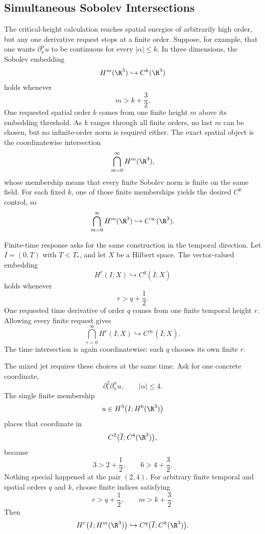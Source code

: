 
\subsection{Simultaneous Sobolev Intersections}\label{sub:SimultaneousSobolevIntersections}

The critical-height calculation reaches spatial energies of arbitrarily high order, but any one derivative request stops at a finite order.
Suppose, for example, that one wants \(\partial_x^\alpha u\) to be continuous for every \(\lvert\alpha\rvert\le k\).
In three dimensions, the Sobolev embedding
\[
  H^m(\R^3)
  \hookrightarrow
  C^k(\R^3)
\]
holds whenever
\[
  m>k+\frac32.
\]
One requested spatial order \(k\) comes from one finite height \(m\) above its embedding threshold.
As \(k\) ranges through all finite orders, no last \(m\) can be chosen, but no infinite-order norm is required either.
The exact spatial object is the coordinatewise intersection
\[
  \bigcap_{m=0}^{\infty}H^m(\R^3),
\]
whose membership means that every finite Sobolev norm is finite on the same field.
For each fixed \(k\), one of those finite memberships yields the desired \(C^k\) control, so
\[
  \bigcap_{m=0}^{\infty}H^m(\R^3)
  \hookrightarrow
  C^\infty(\R^3).
\]

Finite-time response asks for the same construction in the temporal direction.
Let \(I=(0,T)\) with \(T<T_*\), and let \(X\) be a Hilbert space.
The vector-valued embedding
\[
  H^r(I;X)
  \hookrightarrow
  C^q(\overline I;X)
\]
holds whenever
\[
  r>q+\frac12.
\]
One requested time derivative of order \(q\) comes from one finite temporal height \(r\).
Allowing every finite request gives
\[
  \bigcap_{r=0}^{\infty}H^r(I;X)
  \hookrightarrow
  C^\infty(\overline I;X).
\]
The time intersection is again coordinatewise: each \(q\) chooses its own finite \(r\).

The mixed jet requires these choices at the same time.
Ask for one concrete coordinate,
\[
  \partial_t^2\partial_x^\alpha u,
  \qquad
  \lvert\alpha\rvert\le4.
\]
The single finite membership
\[
  u\in H^3\bigl(I;H^6(\R^3)\bigr)
\]
places that coordinate in
\[
  C^2\bigl(\overline I;C^4(\R^3)\bigr),
\]
because
\[
  3>2+\frac12,
  \qquad
  6>4+\frac32.
\]
Nothing special happened at the pair \((2,4)\).
For arbitrary finite temporal and spatial orders \(q\) and \(k\), choose finite indices satisfying
\[
  r>q+\frac12,
  \qquad
  m>k+\frac32.
\]
Then
\[
  H^r\bigl(I;H^m(\R^3)\bigr)
  \hookrightarrow
  C^q\bigl(\overline I;C^k(\R^3)\bigr).
\]


